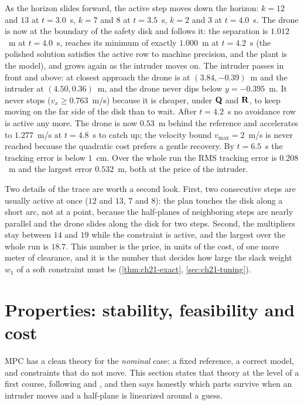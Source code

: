 As the horizon slides forward, the active step moves down the horizon: $k=12$
and $13$ at $t=3.0$~s, $k=7$ and $8$ at $t=3.5$~s, $k=2$ and $3$ at
$t=4.0$~s. The drone is now at the boundary of the safety disk and follows it:
the separation is $1.012$~m at $t=4.0$~s, reaches its minimum of exactly
$1.000$~m at $t=4.2$~s (the polished solution satisfies the active row to
machine precision, and the plant is the model), and grows again as the
intruder moves on. The intruder passes in front and above: at closest approach the drone is
at $(3.84,-0.39)$~m and the intruder at $(4.50,0.36)$~m, and the drone never
dips below $y=-0.395$~m. It never stops
($v_x\ge0.763$~m/s) because it is cheaper, under $\mathbf{Q}$ and $\mathbf{R}$, to
keep moving on the far side of the disk than to wait. After $t=4.2$~s no
avoidance row is active any more. The drone is now $0.53$~m behind the
reference and accelerates to $1.277$~m/s at $t=4.8$~s to catch up; the velocity bound
$v_{\max}=2$~m/s is never reached because the quadratic cost prefers a
gentle recovery. By $t=6.5$~s the tracking error is below $1$~cm. Over the
whole run the RMS tracking error is $0.208$~m and the largest error
$0.532$~m, both at the price of the intruder.

Two details of the trace are worth a second look. First, two consecutive
steps are usually active at once ($12$ and $13$, $7$ and $8$): the plan
touches the disk along a short arc, not at a point, because the half-planes of
neighboring steps are nearly parallel and the drone slides along the disk
for two steps. Second, the multipliers stay between $14$ and $19$ while the
constraint is active, and the largest over the whole run is $18.7$. This
number is the price, in units of the cost, of one more meter of clearance, and
it is the number that decides how large the slack weight $w_1$ of a soft
constraint must be (\cref{thm:ch21-exact}, \cref{sec:ch21-tuning}).

\section{Properties: stability, feasibility and cost}
\label{sec:ch21-properties}

MPC has a clean theory for the \emph{nominal} case: a fixed reference, a
correct model, and constraints that do not move. This section states that
theory at the level of a first course, following \textcite{mayne2000constrained}
and \textcite{rawlings2017mpc}, and then says honestly which parts survive
when an intruder moves and a half-plane is linearized around a guess.


